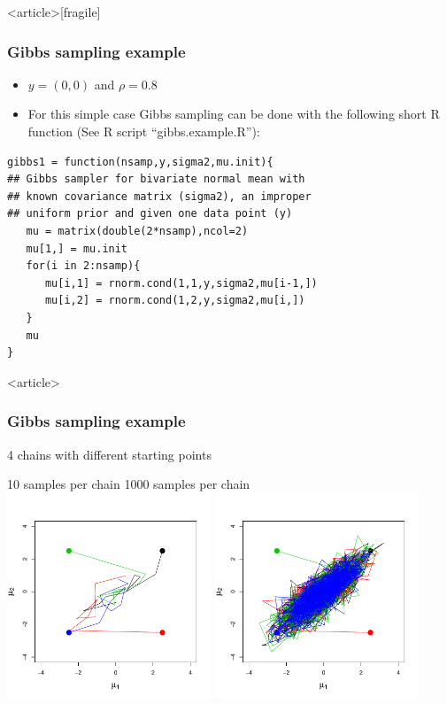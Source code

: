 \documentclass[handout]{beamer}
\begin{document}
\begin{frame}<article>[fragile]
  \frametitle{Gibbs sampling example}

\begin{itemize}  
\item $y = (0, 0)$ and $\rho = 0.8$
\item For this simple case Gibbs sampling can be done with the following short R function (See R script “gibbs.example.R”):
\end{itemize}
\begin{lstlisting}[frame=single]
gibbs1 = function(nsamp,y,sigma2,mu.init){
## Gibbs sampler for bivariate normal mean with
## known covariance matrix (sigma2), an improper
## uniform prior and given one data point (y)
   mu = matrix(double(2*nsamp),ncol=2)
   mu[1,] = mu.init
   for(i in 2:nsamp){
      mu[i,1] = rnorm.cond(1,1,y,sigma2,mu[i-1,])
      mu[i,2] = rnorm.cond(1,2,y,sigma2,mu[i,])
   }
   mu
}
\end{lstlisting}

\end{frame}

\begin{frame}<article>
  \frametitle{Gibbs sampling example}
  
4 chains with different starting points

\vspace{0.5in}
\hspace{0.35in} 10 samples per chain \hspace{0.9in} 1000 samples per chain \\
\vspace{-0.5in}
\includegraphics[width=2.4in]{graphics/gibbsSamplingExample001.pdf}
\includegraphics[width=2.4in]{graphics/gibbsSamplingExample002.pdf}

\end{frame}
\end{document}
